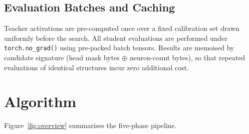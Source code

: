 \documentclass{article}
\begin{document}
\subsection{Evaluation Batches and Caching}

Teacher activations are pre-computed once over a fixed calibration set
drawn uniformly before the search.  All student evaluations are
performed under \texttt{torch.no\_grad()} using pre-packed batch
tensors.  Results are memoised by candidate signature (head mask bytes
$\oplus$ neuron-count bytes), so that repeated evaluations of
identical structures incur zero additional cost.

\section{Algorithm}
\label{sec:algo}

Figure~\ref{fig:overview} summarises the five-phase pipeline.
\end{document}
